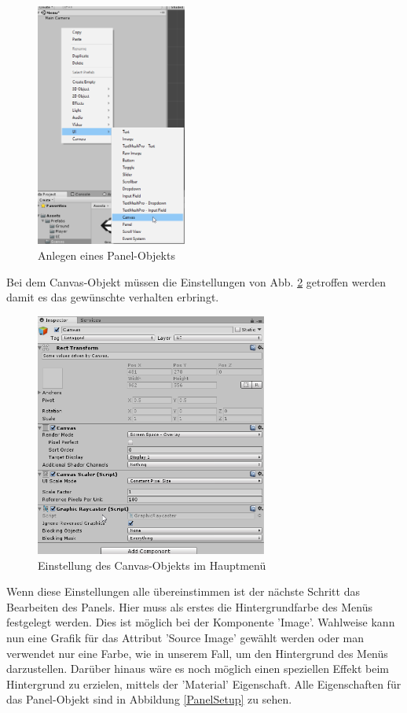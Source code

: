 \begin{figure}[H]

	\includegraphics[height=8cm]{images/PanelAnlegen.png}
	\caption{Anlegen eines Panel-Objekts}
	\label{PanelAnlegen}
\end{figure}
Bei dem Canvas-Objekt müssen die Einstellungen von Abb. \ref{CanvasSetup} getroffen werden damit es das gewünschte verhalten erbringt.
\begin{figure}[H]
	\centering
	\includegraphics[height=8cm]{images/CanvasSetup.png}
	\caption{Einstellung des Canvas-Objekts im Hauptmenü}
	\label{CanvasSetup}
\end{figure}
Wenn diese Einstellungen alle übereinstimmen ist der nächste Schritt das Bearbeiten des Panels. Hier muss als erstes die Hintergrundfarbe des Menüs festgelegt werden. Dies ist möglich bei der Komponente ’Image’. Wahlweise kann nun eine Grafik für das Attribut ’Source Image’ gewählt werden oder man verwendet nur eine Farbe, wie in unserem Fall, um den Hintergrund des Menüs darzustellen. Darüber hinaus wäre es noch möglich einen speziellen Effekt beim Hintergrund zu erzielen, mittels der ’Material’ Eigenschaft. Alle Eigenschaften für das Panel-Objekt sind in Abbildung \ref{PanelSetup} zu sehen.
